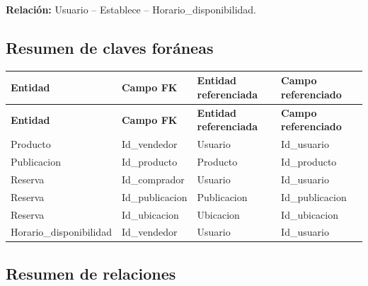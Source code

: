 \documentclass[12pt]{article} %
\begin{document}
\textbf{Relación:}
Usuario -- Establece -- Horario\_disponibilidad.


\subsection{Resumen de claves foráneas}

\begin{longtable}{>{\raggedright\arraybackslash}p{3.5cm}
                  >{\raggedright\arraybackslash}p{3.5cm}
                  >{\raggedright\arraybackslash}p{4.0cm}
                  >{\raggedright\arraybackslash}p{3.5cm}}
\toprule
\textbf{Entidad} &
\textbf{Campo FK} &
\textbf{Entidad referenciada} &
\textbf{Campo referenciado} \\
\midrule
\endfirsthead

\toprule
\textbf{Entidad} &
\textbf{Campo FK} &
\textbf{Entidad referenciada} &
\textbf{Campo referenciado} \\
\midrule
\endhead

Producto &
Id\_vendedor &
Usuario &
Id\_usuario \\

Publicacion &
Id\_producto &
Producto &
Id\_producto \\

Reserva &
Id\_comprador &
Usuario &
Id\_usuario \\

Reserva &
Id\_publicacion &
Publicacion &
Id\_publicacion \\

Reserva &
Id\_ubicacion &
Ubicacion &
Id\_ubicacion \\

Horario\_disponibilidad &
Id\_vendedor &
Usuario &
Id\_usuario \\

\bottomrule
\end{longtable}


\subsection{Resumen de relaciones}
\end{document}
